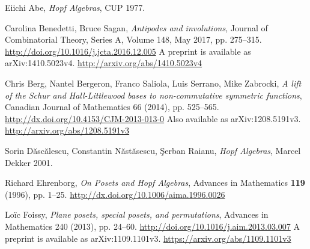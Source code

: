 \documentclass[numbers=enddot,12pt,final,onecolumn,notitlepage,abstracton]{scrartcl}%
\theoremstyle{definition}
\begin{document}
\begin{thebibliography}{99999999}                                                                                         %

Eiichi Abe, \textit{Hopf Algebras}, CUP 1977.


Carolina Benedetti, Bruce Sagan,
\textit{Antipodes and involutions},
Journal of Combinatorial Theory, Series A,
Volume 148, May 2017, pp. 275--315.
\newline\url{http://doi.org/10.1016/j.jcta.2016.12.005}
\newline A preprint is available as arXiv:1410.5023v4.\newline
\url{http://arxiv.org/abs/1410.5023v4}

Chris Berg, Nantel Bergeron, Franco Saliola, Luis
Serrano, Mike Zabrocki, \textit{A lift of the Schur and Hall-Littlewood bases
to non-commutative symmetric functions}, Canadian Journal of Mathematics 66
(2014), pp. 525--565.\newline
\url{http://dx.doi.org/10.4153/CJM-2013-013-0}
\newline Also available as arXiv:1208.5191v3.\newline
\url{http://arxiv.org/abs/1208.5191v3}

Sorin D\u{a}sc\u{a}lescu, Constantin
N\u{a}st\u{a}sescu, \c{S}erban Raianu, \textit{Hopf Algebras}, Marcel Dekker 2001.

Richard Ehrenborg,
\textit{On Posets and Hopf Algebras},
Advances in Mathematics \textbf{119} (1996), pp. 1--25.
\newline\url{http://dx.doi.org/10.1006/aima.1996.0026}

Lo\"ic Foissy,
\textit{Plane posets, special posets, and permutations},
Advances in Mathematics 240 (2013), pp. 24--60.
\newline\url{http://doi.org/10.1016/j.aim.2013.03.007}
\newline A preprint is available as arXiv:1109.1101v3.\newline
\url{https://arxiv.org/abs/1109.1101v3}


\end{thebibliography}
\end{document}
